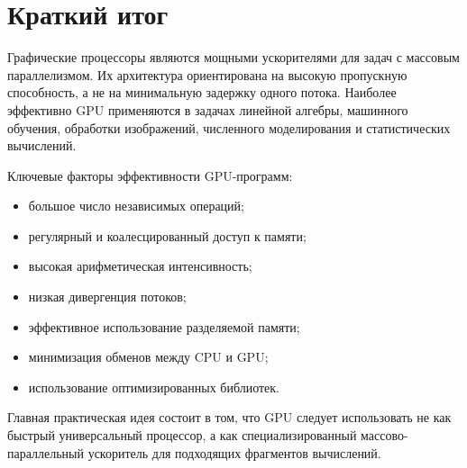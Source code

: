 \documentclass[12pt,a4paper]{article}
\begin{document}
\section{Краткий итог}

Графические процессоры являются мощными ускорителями для задач с массовым параллелизмом. Их архитектура ориентирована на высокую пропускную способность, а не на минимальную задержку одного потока. Наиболее эффективно GPU применяются в задачах линейной алгебры, машинного обучения, обработки изображений, численного моделирования и статистических вычислений.

Ключевые факторы эффективности GPU-программ:

\begin{itemize}
    \item большое число независимых операций;
    \item регулярный и коалесцированный доступ к памяти;
    \item высокая арифметическая интенсивность;
    \item низкая дивергенция потоков;
    \item эффективное использование разделяемой памяти;
    \item минимизация обменов между CPU и GPU;
    \item использование оптимизированных библиотек.
\end{itemize}

Главная практическая идея состоит в том, что GPU следует использовать не как быстрый универсальный процессор, а как специализированный массово-параллельный ускоритель для подходящих фрагментов вычислений.
\end{document}
